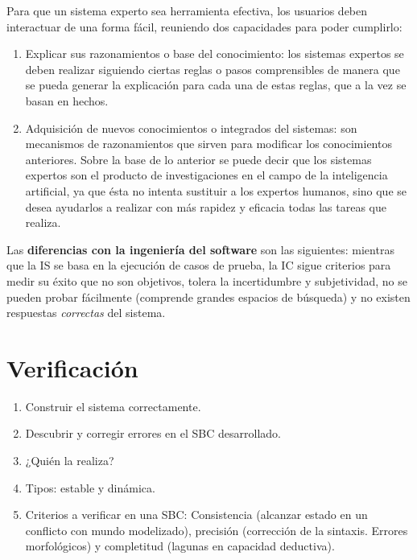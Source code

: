 \documentclass[12pt]{article}
\begin{document}
Para que un sistema experto sea herramienta efectiva, los usuarios deben interactuar de una forma fácil, reuniendo dos capacidades para poder cumplirlo:
\begin{enumerate}
\item Explicar sus razonamientos o base del conocimiento: los sistemas expertos se deben realizar siguiendo ciertas reglas o pasos comprensibles de manera que se pueda generar la explicación para cada una de estas reglas, que a la vez se basan en hechos.
\item Adquisición de nuevos conocimientos o integrados del sistemas: son mecanismos de razonamientos que sirven para modificar los conocimientos anteriores. Sobre la base de lo anterior se puede decir que los sistemas expertos son el producto de investigaciones en el campo de la inteligencia artificial, ya que ésta no intenta sustituir a los expertos humanos, sino que se desea ayudarlos a realizar con más rapidez y eficacia todas las tareas que realiza.
\end{enumerate}

Las \textbf{diferencias con la ingeniería del software} son las siguientes: mientras que la IS se basa en la ejecución de casos de prueba, la IC sigue criterios para medir su éxito que no son objetivos, tolera la incertidumbre y subjetividad, no se pueden probar fácilmente (comprende grandes espacios de búsqueda) y no existen respuestas \textit{correctas} del sistema.

\section{Verificación}
\begin{enumerate}
\item Construir el sistema correctamente.
\item Descubrir y corregir errores en el SBC desarrollado.
\item ¿Quién la realiza?
\item Tipos: estable y dinámica.
\item Criterios a verificar en una SBC: Consistencia (alcanzar estado en un conflicto con mundo modelizado), precisión (corrección de la sintaxis. Errores morfológicos) y completitud (lagunas en capacidad deductiva).
\end{enumerate}
\end{document}
